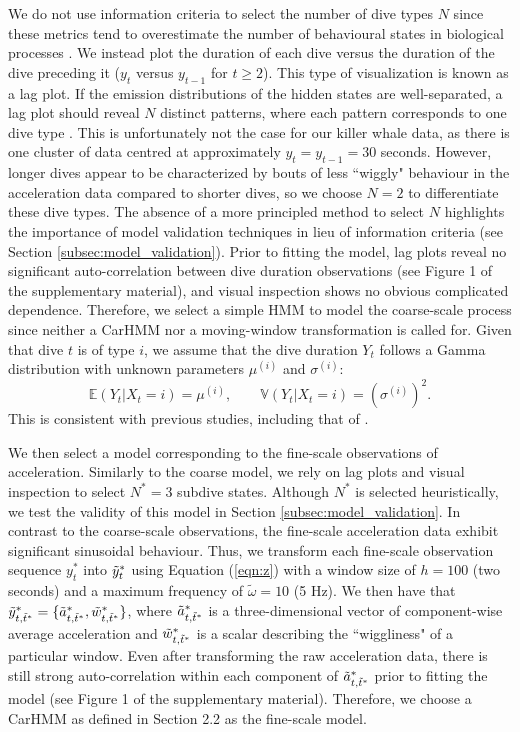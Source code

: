 We do not use information criteria to select the number of dive types $N$ since these metrics tend to overestimate the number of behavioural states in biological processes \citep{Pohle:2017}. We instead plot the duration of each dive versus the duration of the dive preceding it ($y_t$ versus $y_{t-1}$ for $t \geq 2$). This type of visualization is known as a lag plot. If the emission distributions of the hidden states are well-separated, a lag plot should reveal $N$ distinct patterns, where each pattern corresponds to one dive type \citep{Lawler:2019}. This is unfortunately not the case for our killer whale data, as there is one cluster of data centred at approximately $y_t = y_{t-1} = 30$ seconds. However, longer dives appear to be characterized by bouts of less ``wiggly" behaviour in the acceleration data compared to shorter dives, so we choose $N = 2$ to differentiate these dive types. The absence of a more principled method to select $N$ highlights the importance of model validation techniques in lieu of information criteria (see Section \ref{subsec:model_validation}).
%
Prior to fitting the model, lag plots reveal no significant auto-correlation between dive duration observations (see Figure 1 of the supplementary material), and visual inspection shows no obvious complicated dependence. Therefore, we select a simple HMM to model the coarse-scale process since neither a CarHMM nor a moving-window transformation is called for.
%
Given that dive $t$ is of type $i$, we assume that the dive duration $Y_t$ follows a Gamma distribution with unknown parameters $\mu^{(i)}$ and $\sigma^{(i)}$:
%
$$\mathbb{E}(Y_t|X_t = i) = \mu^{(i)}, \qquad \mathbb{V}(Y_t|X_t = i) = \left(\sigma^{(i)}\right)^2.$$
%
This is consistent with previous studies, including that of \citet{Barajas:2017}. 
%

We then select a model corresponding to the fine-scale observations of acceleration. Similarly to the coarse model, we rely on lag plots and visual inspection to select $N^*=3$ subdive states. Although $N^*$ is selected heuristically, we test the validity of this model in Section \ref{subsec:model_validation}.
%
In contrast to the coarse-scale observations, the fine-scale acceleration data exhibit significant sinusoidal behaviour. Thus, we transform each fine-scale observation sequence $y_t^*$ into $\tilde{y}^*_t$ using Equation (\ref{eqn:z}) with a window size of $h=100$ (two seconds) and a maximum frequency of $\tilde{\omega}=10$ (5 Hz). 
We then have that $\tilde{y}^*_{t,\tilde t^*} = \{\tilde{a}^*_{t,\tilde t^*},\tilde{w}^*_{t,\tilde t^*}\}$, where $\tilde{a}^*_{t,\tilde t^*}$ is a three-dimensional vector of component-wise average acceleration and $\tilde{w}^*_{t,\tilde t^*}$ is a scalar describing the ``wiggliness" of a particular window. Even after transforming the raw acceleration data, there is still strong auto-correlation within each component of $\tilde{a}^*_{t,\tilde t^*}$ prior to fitting the model (see Figure 1 of the supplementary material). Therefore, we choose a CarHMM as defined in Section 2.2 as the fine-scale model.

